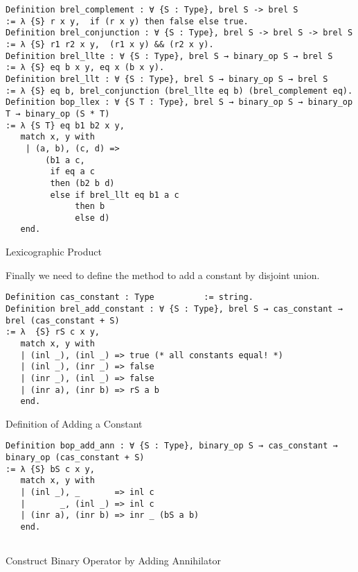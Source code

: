 \begin{listing}[H]
\begin{verbatim}
Definition brel_complement : ∀ {S : Type}, brel S -> brel S 
:= λ {S} r x y,  if (r x y) then false else true.    
Definition brel_conjunction : ∀ {S : Type}, brel S -> brel S -> brel S 
:= λ {S} r1 r2 x y,  (r1 x y) && (r2 x y).    
Definition brel_llte : ∀ {S : Type}, brel S → binary_op S → brel S 
:= λ {S} eq b x y, eq x (b x y).    
Definition brel_llt : ∀ {S : Type}, brel S → binary_op S → brel S 
:= λ {S} eq b, brel_conjunction (brel_llte eq b) (brel_complement eq).  
Definition bop_llex : ∀ {S T : Type}, brel S → binary_op S → binary_op T → binary_op (S * T) 
:= λ {S T} eq b1 b2 x y,  
   match x, y with
    | (a, b), (c, d) => 
        (b1 a c, 
         if eq a c 
         then (b2 b d)
         else if brel_llt eq b1 a c 
              then b 
              else d)
   end.
\end{verbatim}
\caption{Lexicographic Product} 
\label{coq:def:lexicographic_product}
\end{listing}

Finally we need to define the method to add a constant by disjoint union.

\begin{listing}[H]
\begin{verbatim}
Definition cas_constant : Type          := string.   
Definition brel_add_constant : ∀ {S : Type}, brel S → cas_constant → brel (cas_constant + S)
:= λ  {S} rS c x y, 
   match x, y with
   | (inl _), (inl _) => true (* all constants equal! *) 
   | (inl _), (inr _) => false 
   | (inr _), (inl _) => false 
   | (inr a), (inr b) => rS a b 
   end.

\end{verbatim}
\caption{Definition of Adding a Constant} 
\label{coq:def:add_const}
\end{listing}


\begin{listing}[H]
\begin{verbatim}
Definition bop_add_ann : ∀ {S : Type}, binary_op S → cas_constant → binary_op (cas_constant + S)
:= λ {S} bS c x y, 
   match x, y with
   | (inl _), _       => inl c
   |       _, (inl _) => inl c
   | (inr a), (inr b) => inr _ (bS a b)
   end.
   
\end{verbatim}
\caption{Construct Binary Operator by Adding Annihilator} 
\label{coq:def:add_const_ann}
\end{listing}


